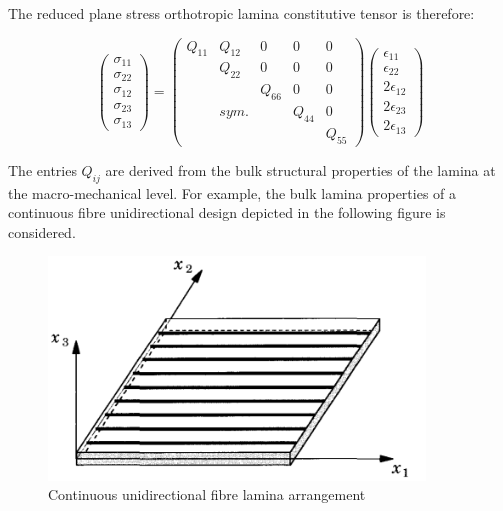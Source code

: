 The reduced plane stress orthotropic lamina constitutive tensor is therefore:

\begin{equation} 
\begin{pmatrix}
\sigma_{11} \\
\sigma_{22} \\
\sigma_{12} \\
\sigma_{23} \\
\sigma_{13} 
\end{pmatrix}
=
\begin{pmatrix}
Q_{11} & Q_{12} &  0 & 0 & 0 \\
\  & Q_{22} &  0 & 0 & 0 \\
\  & \  & Q_{66}  & 0 & 0 \\
\  & sym. & \  & Q_{44} & 0 \\
\  & \  & \  & \ & Q_{55}
\end{pmatrix}
\begin{pmatrix}
\epsilon_{11} \\
\epsilon_{22} \\
2\epsilon_{12}\\
2\epsilon_{23} \\
2\epsilon_{13}
\end{pmatrix}
\label{eqscomp_plane_stress_tensor_unrotated}
\end{equation}

The entries $Q_{ij}$ are derived from the bulk structural properties of the lamina at the macro-mechanical level. For example, the bulk lamina properties of a continuous fibre unidirectional design depicted in the following figure is considered.

\begin{figure}[H]
	\centering
	\includegraphics[width=10cm]{images/composite_unidirectional_lamina}
	\caption{Continuous unidirectional fibre lamina arrangement \cite{reddy2004mechanics}}
	\label{fig:compositeunidirectionallamina}
\end{figure}

